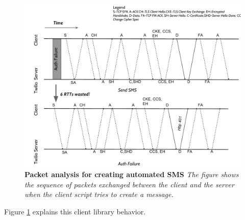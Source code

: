 \begin{figure}[t!] \centering
\includegraphics[width=\textwidth]{figs/authfailure.pdf}
\caption{\textbf{Packet analysis for creating automated SMS} {\footnotesize\textit{
The figure shows the sequence of packets exchanged between the client and the server when the client script tries to create a message.
}}}
\label{fig:authfailure}
\end{figure}

Figure {\ref{fig:authfailure}} explains this client library behavior. 
